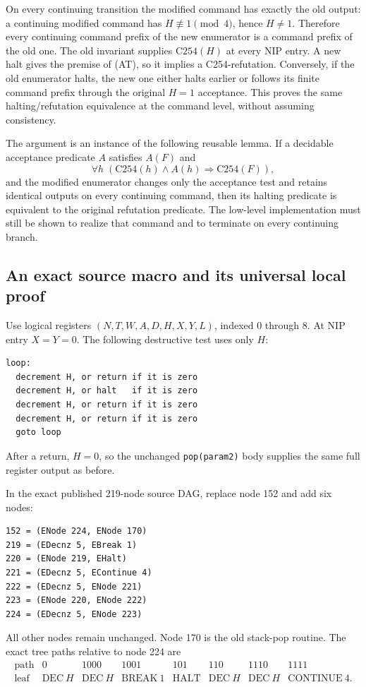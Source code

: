 On every continuing transition the modified command has exactly the old
output: a continuing modified command has $H\not\equiv1\pmod4$, hence
$H\ne1$.  Therefore every continuing command prefix of the new enumerator is
a command prefix of the old one.  The old invariant supplies
$\mathrm{C254}(H)$ at every NIP entry.  A new halt gives the premise of (AT),
so it implies a C254-refutation.  Conversely, if the old enumerator halts, the
new one either halts earlier or follows its finite command prefix through the
original $H=1$ acceptance.  This proves the same halting/refutation equivalence
at the command level, without assuming consistency.

The argument is an instance of the following reusable lemma.  If a decidable
acceptance predicate $A$ satisfies $A(F)$ and
\[
 \forall h\;(\mathrm{C254}(h)\land A(h)\Rightarrow\mathrm{C254}(F)),
\]
and the modified enumerator changes only the acceptance test and retains
identical outputs on every continuing command, then its halting predicate is
equivalent to the original refutation predicate.  The low-level implementation
must still be shown to realize that command and to terminate on every
continuing branch.

\subsection{An exact source macro and its universal local proof}

Use logical registers $(N,T,W,A,D,H,X,Y,L)$, indexed $0$ through $8$.
At NIP entry $X=Y=0$.  The following destructive test uses only $H$:
\begin{verbatim}
loop:
  decrement H, or return if it is zero
  decrement H, or halt   if it is zero
  decrement H, or return if it is zero
  decrement H, or return if it is zero
  goto loop
\end{verbatim}
After a return, $H=0$, so the unchanged \texttt{pop(param2)} body supplies the
same full register output as before.

In the exact published 219-node source DAG, replace node 152 and add six nodes:
\begin{verbatim}
152 = (ENode 224, ENode 170)
219 = (EDecnz 5, EBreak 1)
220 = (ENode 219, EHalt)
221 = (EDecnz 5, EContinue 4)
222 = (EDecnz 5, ENode 221)
223 = (ENode 220, ENode 222)
224 = (EDecnz 5, ENode 223)
\end{verbatim}
All other nodes remain unchanged.  Node 170 is the old stack-pop routine.
The exact tree paths relative to node 224 are
\[
\begin{array}{c|ccccccc}
 \text{path}&0&1000&1001&101&110&1110&1111\\ \hline
 \text{leaf}&\mathrm{DEC}\ H&\mathrm{DEC}\ H&\mathrm{BREAK}\ 1&
 \mathrm{HALT}&\mathrm{DEC}\ H&\mathrm{DEC}\ H&\mathrm{CONTINUE}\ 4.
\end{array}
\]

